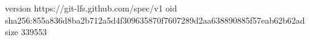 version https://git-lfs.github.com/spec/v1
oid sha256:855a836d8ba2b712a5d4f309635870f7607289d2aa638890885f57eab62b62ad
size 339553
